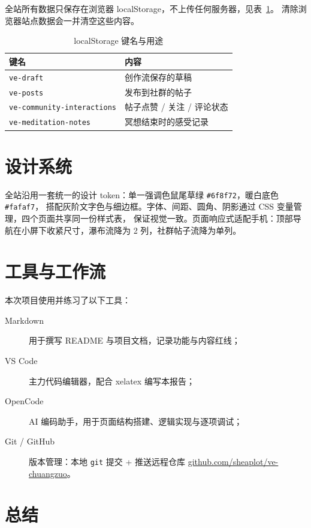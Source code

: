\documentclass[12pt,a4paper]{ctexart}
\begin{document}
全站所有数据只保存在浏览器 localStorage，不上传任何服务器，见表~\ref{tab:storage}。
清除浏览器站点数据会一并清空这些内容。

\begin{table}[h]
  \centering
  \begin{tabular}{@{}ll@{}}
    \toprule
    键名 & 内容 \\
    \midrule
    \texttt{ve-draft} & 创作流保存的草稿 \\
    \texttt{ve-posts} & 发布到社群的帖子 \\
    \texttt{ve-community-interactions} & 帖子点赞 / 关注 / 评论状态 \\
    \texttt{ve-meditation-notes} & 冥想结束时的感受记录 \\
    \bottomrule
  \end{tabular}
  \caption{localStorage 键名与用途}
  \label{tab:storage}
\end{table}

\section{设计系统}

全站沿用一套统一的设计 token：单一强调色鼠尾草绿 \texttt{\#6f8f72}，暖白底色 \texttt{\#fafaf7}，
搭配灰阶文字色与细边框。字体、间距、圆角、阴影通过 CSS 变量管理，四个页面共享同一份样式表，
保证视觉一致。页面响应式适配手机：顶部导航在小屏下收紧尺寸，瀑布流降为 2 列，社群帖子流降为单列。

\section{工具与工作流}

本次项目使用并练习了以下工具：

\begin{description}
  \item[Markdown] 用于撰写 README 与项目文档，记录功能与内容红线；
  \item[VS Code] 主力代码编辑器，配合 xelatex 编写本报告；
  \item[OpenCode] AI 编码助手，用于页面结构搭建、逻辑实现与逐项调试；
  \item[Git / GitHub] 版本管理：本地 \texttt{git} 提交 + 推送远程仓库
    \href{https://github.com/sheaplot/ve-chuangzuo}{github.com/sheaplot/ve-chuangzuo}。
\end{description}

\section{总结}
\end{document}
